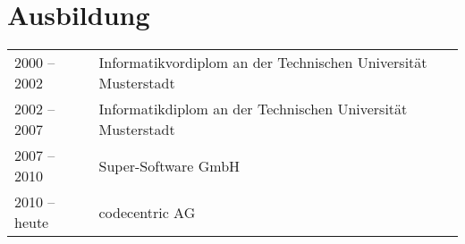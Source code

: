 \section*{Ausbildung}
\begin{tabular}{@{}p{6cm}p{10cm}}
2000 -- 2002	& Informatikvordiplom an der Technischen Universität Musterstadt\\
2002 -- 2007	& Informatikdiplom an der Technischen Universität Musterstadt\\
2007 -- 2010	& Super-Software GmbH\\
2010 -- heute	& codecentric AG
\end{tabular}

